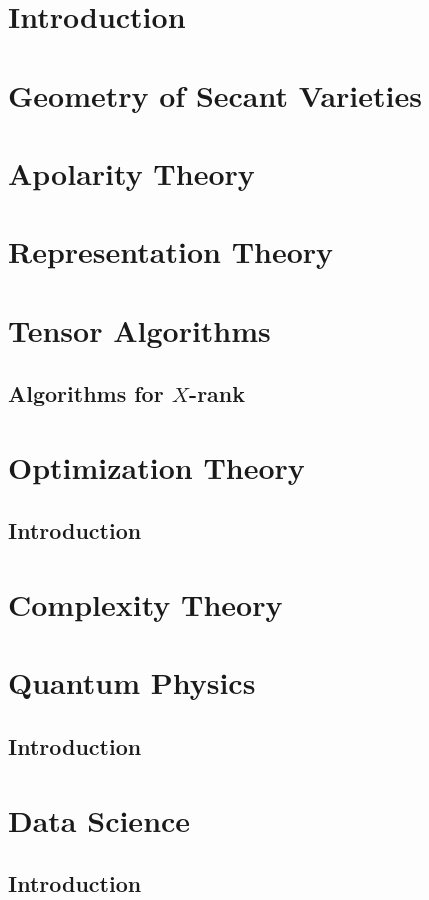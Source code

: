 \documentclass[oneside]{book}
\theoremstyle{plain}
\theoremstyle{definition}
\numberwithin{equation}{subsection}
\begin{document}
\part{Introduction}
\label{part-introduction}


\part{Geometry of Secant Varieties}
\label{part-geometrySecants}


\part{Apolarity Theory}
\label{part-apolarity}


\part{Representation Theory}
\label{part-RepTheory}


\part{Tensor Algorithms}
\label{part-TensorAlgorithms}
\chapter{Algorithms for $ X $-rank}
\label{rankAlgorithms-chapter-intro}



\part{Optimization Theory}
\label{part-optimization}

\chapter{Introduction}
\label{optimization-chapter-intro}

\part{Complexity Theory}
\label{part-complexityTheory}


\part{Quantum Physics}
\label{part-quantumph}

\chapter{Introduction}
\label{quantumph-chapter-intro}

\part{Data Science}
\label{part-datascience}

\chapter{Introduction}
\label{datascience-chapter-intro}



\end{document}
